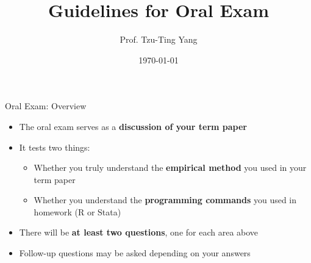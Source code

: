 \documentclass[dvipsnames,hyperref={pdfpagelabels=false}]{beamer}
\title[]
{Guidelines for Oral Exam}
\author
{Prof. Tzu-Ting Yang}
\institute{Institute of Economics, Academia Sinica}
\date{\today}
\begin{document}
\begin{frame}{}
	\titlepage
\end{frame}


\begin{frame}{Oral Exam: Overview}

\begin{itemize}
	\item The oral exam serves as a \textbf{discussion of your term paper}
	\vspace{0.3cm}

	\item It tests two things:
	\vspace{0.2cm}
	\begin{itemize}
		\item[(1)] Whether you truly understand the \textbf{empirical method} you used in your term paper
		\vspace{0.2cm}
		\item[(2)] Whether you understand the \textbf{programming commands} you used in homework (R or Stata)
	\end{itemize}
	\vspace{0.3cm}

	\item There will be \textbf{at least two questions}, one for each area above
	\vspace{0.3cm}

	\item Follow-up questions may be asked depending on your answers
\end{itemize}

\end{frame}
\end{document}
